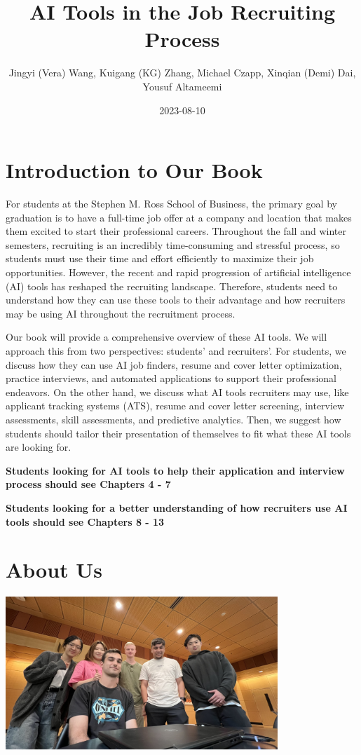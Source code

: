 \documentclass[
]{book}
\title{AI Tools in the Job Recruiting Process}
\author{Jingyi (Vera) Wang, Kuigang (KG) Zhang, Michael Czapp, Xinqian (Demi) Dai, Yousuf Altameemi}
\date{2023-08-10}
\begin{document}
\maketitle

{
\setcounter{tocdepth}{1}
\tableofcontents
}
\hypertarget{introduction-to-our-book}{%
\chapter{Introduction to Our Book}\label{introduction-to-our-book}}

For students at the Stephen M. Ross School of Business, the primary goal by graduation is to have a full-time job offer at a company and location that makes them excited to start their professional careers. Throughout the fall and winter semesters, recruiting is an incredibly time-consuming and stressful process, so students must use their time and effort efficiently to maximize their job opportunities. However, the recent and rapid progression of artificial intelligence (AI) tools has reshaped the recruiting landscape. Therefore, students need to understand how they can use these tools to their advantage and how recruiters may be using AI throughout the recruitment process.

Our book will provide a comprehensive overview of these AI tools. We will approach this from two perspectives: students' and recruiters'. For students, we discuss how they can use AI job finders, resume and cover letter optimization, practice interviews, and automated applications to support their professional endeavors. On the other hand, we discuss what AI tools recruiters may use, like applicant tracking systems (ATS), resume and cover letter screening, interview assessments, skill assessments, and predictive analytics. Then, we suggest how students should tailor their presentation of themselves to fit what these AI tools are looking for.

\textbf{Students looking for AI tools to help their application and interview process should see Chapters 4 - 7}

\textbf{Students looking for a better understanding of how recruiters use AI tools should see Chapters 8 - 13}

\hypertarget{about-us}{%
\chapter{About Us}\label{about-us}}

\includegraphics[width=4.04167in,height=\textheight]{Team Photo.jpg}
\end{document}
